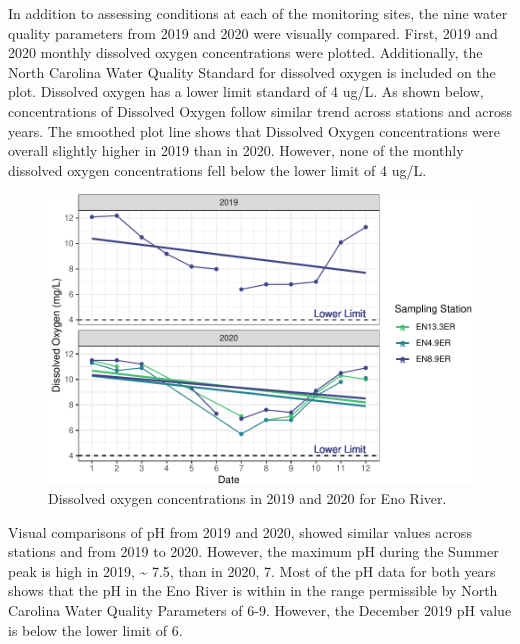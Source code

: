 \documentclass[
  12pt,
]{article}
\begin{document}
In addition to assessing conditions at each of the monitoring sites, the
nine water quality parameters from 2019 and 2020 were visually compared.
First, 2019 and 2020 monthly dissolved oxygen concentrations were
plotted. Additionally, the North Carolina Water Quality Standard for
dissolved oxygen is included on the plot. Dissolved oxygen has a lower
limit standard of 4 ug/L. As shown below, concentrations of Dissolved
Oxygen follow similar trend across stations and across years. The
smoothed plot line shows that Dissolved Oxygen concentrations were
overall slightly higher in 2019 than in 2020. However, none of the
monthly dissolved oxygen concentrations fell below the lower limit of 4
ug/L.

\begin{figure}
\centering
\includegraphics{August_Lindborg_ENV872_Project_files/figure-latex/unnamed-chunk-5-1.pdf}
\caption{Dissolved oxygen concentrations in 2019 and 2020 for Eno
River.}
\end{figure}

Visual comparisons of pH from 2019 and 2020, showed similar values
across stations and from 2019 to 2020. However, the maximum pH during
the Summer peak is high in 2019, \textasciitilde{} 7.5, than in 2020, 7.
Most of the pH data for both years shows that the pH in the Eno River is
within in the range permissible by North Carolina Water Quality
Parameters of 6-9. However, the December 2019 pH value is below the
lower limit of 6.
\end{document}
